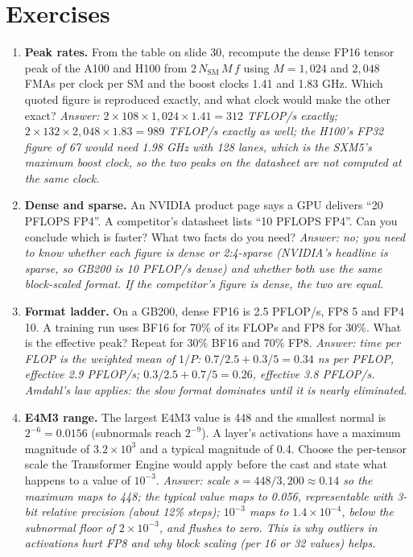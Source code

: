 \documentclass[11pt,letterpaper]{article}
\begin{document}
\clearpage
\section{Exercises}

\begin{enumerate}[leftmargin=1.6em,itemsep=6pt]
\item \textbf{Peak rates.} From the table on slide 30, recompute the dense FP16 tensor peak of the A100 and H100 from $2\,N_{\mathrm{SM}}\,M\,f$ using $M = 1{,}024$ and $2{,}048$ FMAs per clock per SM and the boost clocks 1.41 and 1.83 GHz. Which quoted figure is reproduced exactly, and what clock would make the other exact? \emph{Answer: $2\times 108\times 1{,}024\times 1.41 = 312$ TFLOP/s exactly; $2\times 132\times 2{,}048\times 1.83 = 989$ TFLOP/s exactly as well; the H100's FP32 figure of 67 would need 1.98 GHz with 128 lanes, which is the SXM5's maximum boost clock, so the two peaks on the datasheet are not computed at the same clock.}
\item \textbf{Dense and sparse.} An NVIDIA product page says a GPU delivers ``20 PFLOPS FP4''. A competitor's datasheet lists ``10 PFLOPS FP4''. Can you conclude which is faster? What two facts do you need? \emph{Answer: no; you need to know whether each figure is dense or 2:4-sparse (NVIDIA's headline is sparse, so GB200 is 10 PFLOP/s dense) and whether both use the same block-scaled format. If the competitor's figure is dense, the two are equal.}
\item \textbf{Format ladder.} On a GB200, dense FP16 is 2.5 PFLOP/s, FP8 5 and FP4 10. A training run uses BF16 for 70\% of its FLOPs and FP8 for 30\%. What is the effective peak? Repeat for 30\% BF16 and 70\% FP8. \emph{Answer: time per FLOP is the weighted mean of $1/P$: $0.7/2.5 + 0.3/5 = 0.34$ ns per PFLOP, effective 2.9 PFLOP/s; $0.3/2.5 + 0.7/5 = 0.26$, effective 3.8 PFLOP/s. Amdahl's law applies: the slow format dominates until it is nearly eliminated.}
\item \textbf{E4M3 range.} The largest E4M3 value is 448 and the smallest normal is $2^{-6} = 0.0156$ (subnormals reach $2^{-9}$). A layer's activations have a maximum magnitude of $3.2\times 10^{3}$ and a typical magnitude of 0.4. Choose the per-tensor scale the Transformer Engine would apply before the cast and state what happens to a value of $10^{-3}$. \emph{Answer: scale $s = 448/3{,}200 \approx 0.14$ so the maximum maps to 448; the typical value maps to 0.056, representable with 3-bit relative precision (about 12\% steps); $10^{-3}$ maps to $1.4\times 10^{-4}$, below the subnormal floor of $2\times 10^{-3}$, and flushes to zero. This is why outliers in activations hurt FP8 and why block scaling (per 16 or 32 values) helps.}

\end{enumerate}
\end{document}
